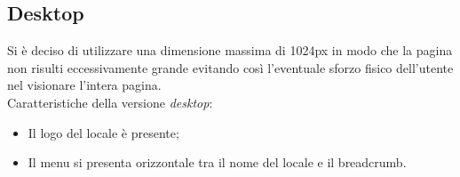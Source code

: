 \subsection{Desktop}
Si è deciso di utilizzare una dimensione massima di 1024px in modo che la pagina non risulti eccessivamente grande evitando così l'eventuale sforzo fisico dell'utente nel visionare l'intera pagina.\\
Caratteristiche della versione \emph{desktop}:
\begin{itemize}
	\item Il logo del locale è presente;
	\item Il menu si presenta orizzontale tra il nome del locale e il breadcrumb.
\end{itemize}